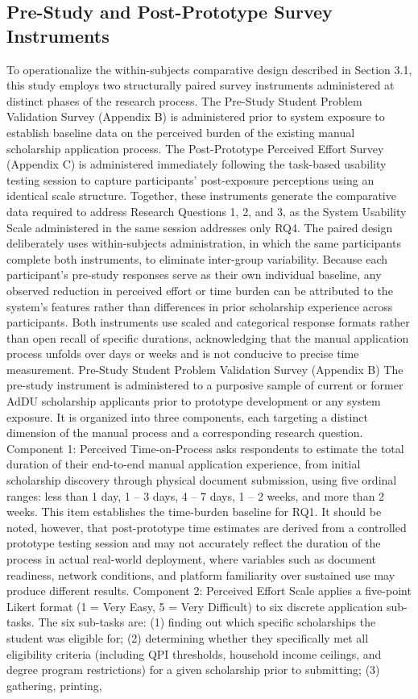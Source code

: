 \subsection{Pre-Study and Post-Prototype Survey Instruments}

To operationalize the within-subjects comparative design described in Section 3.1, this study employs two structurally paired survey instruments administered at distinct phases of the research process. The Pre-Study Student Problem Validation Survey (Appendix B) is administered prior to system exposure to establish baseline data on the perceived burden of the existing manual scholarship application process. The Post-Prototype Perceived Effort Survey (Appendix C) is administered immediately following the task-based usability testing session to capture participants' post-exposure perceptions using an identical scale structure. Together, these instruments generate the comparative data required to address Research Questions 1, 2, and 3, as the System Usability Scale administered in the same session addresses only RQ4. The paired design deliberately uses within-subjects administration, in which the same participants complete both instruments, to eliminate inter-group variability. Because each participant's pre-study responses serve as their own individual baseline, any observed reduction in perceived effort or time burden can be attributed to the system's features rather than differences in prior scholarship experience across participants. Both instruments use scaled and categorical response formats rather than open recall of specific durations, acknowledging that the manual application process unfolds over days or weeks and is not conducive to precise time measurement. Pre-Study Student Problem Validation Survey (Appendix B) The pre-study instrument is administered to a purposive sample of current or former AdDU scholarship applicants prior to prototype development or any system exposure. It is organized into three components, each targeting a distinct dimension of the manual process and a corresponding research question. Component 1: Perceived Time-on-Process asks respondents to estimate the total duration of their end-to-end manual application experience, from initial scholarship discovery through physical document submission, using five ordinal ranges: less than 1 day, 1 -- 3 days, 4 -- 7 days, 1 -- 2 weeks, and more than 2 weeks. This item establishes the time-burden baseline for RQ1. It should be noted, however, that post-prototype time estimates are derived from a controlled prototype testing session and may not accurately reflect the duration of the process in actual real-world deployment, where variables such as document readiness, network conditions, and platform familiarity over sustained use may produce different results. Component 2: Perceived Effort Scale applies a five-point Likert format (1 = Very Easy, 5 = Very Difficult) to six discrete application sub-tasks. The six sub-tasks are: (1) finding out which specific scholarships the student was eligible for; (2) determining whether they specifically met all eligibility criteria (including QPI thresholds, household income ceilings, and degree program restrictions) for a given scholarship prior to submitting; (3) gathering, printing, 